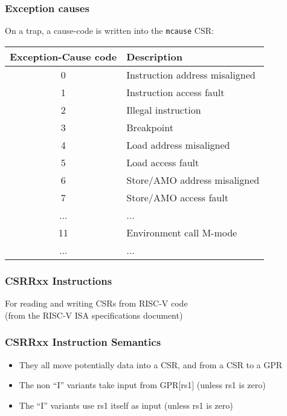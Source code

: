 \begin{frame}
\frametitle{Exception causes}

On a trap, a cause-code is written into the {\tt mcause} CSR:

\begin{center}\small
 \begin{tabular}{|c|l|}
  \hline
  Exception-Cause code & Description \\
  \hline
  0 & Instruction address misaligned \\
  1 & Instruction access fault \\
  2 & Illegal instruction \\
  3 & Breakpoint \\
  4 & Load address misaligned \\
  5 & Load access fault \\
  6 & Store/AMO address misaligned \\
  7 & Store/AMO access fault \\
  ... & ... \\
  11 & Environment call M-mode \\
  ... & ... \\
  \hline
 \end{tabular}
\end{center}

\end{frame}


\begin{frame}
\frametitle{CSRRxx Instructions}

For reading and writing CSRs from RISC-V code \\
(from the RISC-V ISA specifications document)

\vspace{1ex}

\begin{center}
\end{center}

\end{frame}


\begin{frame}
\frametitle{CSRRxx Instruction Semantics}

\begin{center}
\end{center}

{\footnotesize
\begin{itemize}
\item They all move potentially data into a CSR, and from a CSR to a GPR
\item The non ``I'' variants take input from GPR[rs1] (unless rs1 is zero)
\item The ``I'' variants use rs1 itself as input (unless rs1 is zero)
\end{itemize}}

\end{frame}

